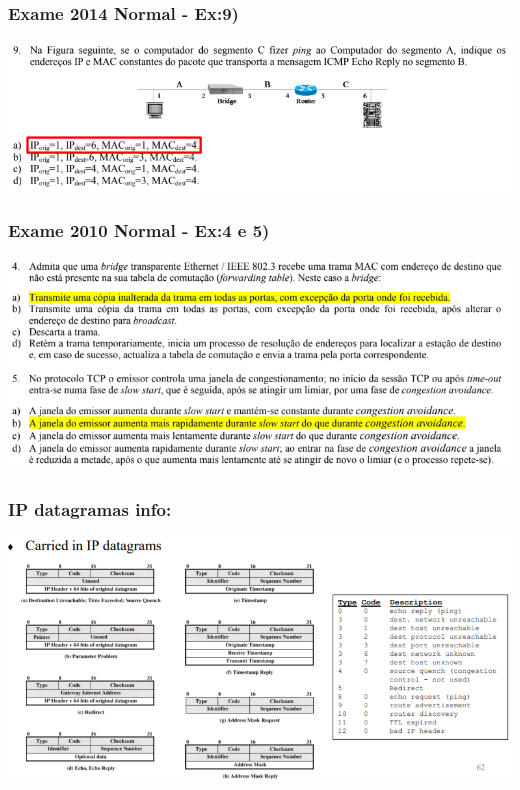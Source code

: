 \documentclass[../resumosRCOM.tex]{subfiles}
\begin{document}
\subsubsection{Exame 2014 Normal - Ex:9)}
\begin{center}
    \includegraphics[width=15cm]{images/RCOM52.png}
\end{center}

\subsubsection{Exame 2010 Normal - Ex:4 e 5)}
\begin{center}
    \includegraphics[width=15cm]{images/RCOM54.png}
\end{center}


\subsubsection{IP datagramas info:}
\begin{center}
    \includegraphics[width=15cm]{images/RCOM30.png}
\end{center}
\end{document}
